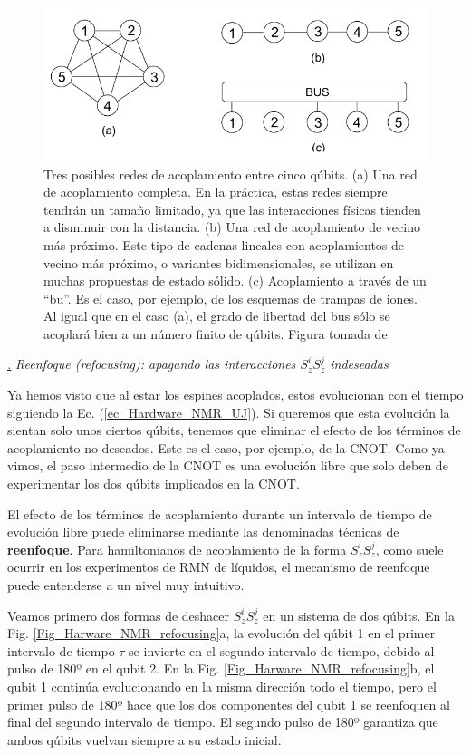 \documentclass[a4paper,11pt]{book} %
\numberwithin{equation}{chapter}
\def\subsubiContadorIt{\par\addtocounter{subsubsection}{1}\underline{\it\thesubsubsection.}\hskip0.5cm \setcounter{subsubsubsectionIt}{0}}
\newcommand{\SubsubiIt}[1]{
		\subsubiContadorIt \textit{#1}
	}
\newcounter{subsubsubsectionIt}[subsubsection]
\begin{document}
	\begin{figure}[H]
	\centering 
	\includegraphics[width=0.65\linewidth]{Figuras/Fig_Harware_NMR_posible_couplings.png}
	\caption{Tres posibles redes de acoplamiento entre cinco qúbits. (a) Una red de acoplamiento completa. En la práctica, estas redes siempre tendrán un tamaño limitado, ya que las interacciones físicas tienden a disminuir con la distancia. (b) Una red de acoplamiento de vecino más próximo. Este tipo de cadenas lineales con acoplamientos de vecino más próximo, o variantes bidimensionales, se utilizan en muchas propuestas de estado sólido. (c) Acoplamiento a través de un ``bu''. Es el caso, por ejemplo, de los esquemas de trampas de iones. Al igual que en el caso (a), el grado de libertad del bus sólo se acoplará bien a un número finito de qúbits. Figura tomada de \cite{NMR_hardware}}
	\label{Fig_Harware_NMR_posible_couplings}
	\end{figure}






			\SubsubiIt{Reenfoque (refocusing): apagando las interacciones $S_z^i S_z^j$ indeseadas} 

Ya hemos visto que al estar los espines acoplados, estos evolucionan con el tiempo siguiendo la Ec. (\ref{ec_Hardware_NMR_UJ}). Si queremos que esta evolución la sientan solo unos ciertos qúbits, tenemos que eliminar el efecto de los términos de acoplamiento no deseados. Este es el caso, por ejemplo, de la CNOT. Como ya vimos, el paso intermedio de la CNOT es una evolución libre que solo deben de experimentar los dos qúbits implicados en la CNOT. 

El efecto de los términos de acoplamiento durante un intervalo de tiempo de evolución libre puede eliminarse mediante las denominadas técnicas de \textbf{reenfoque}.  Para hamiltonianos de acoplamiento de la forma $S_z^i S_z^j$, como suele ocurrir en los experimentos de RMN de líquidos, el mecanismo de reenfoque puede entenderse a un nivel muy intuitivo. 

Veamos primero dos formas de deshacer $S_z^i S_z^j$ en un sistema de dos qúbits. En la Fig. \ref{Fig_Harware_NMR_refocusing}a, la evolución del qúbit 1 en el primer intervalo de tiempo $\tau$ se invierte en el segundo intervalo de tiempo, debido al pulso de 180º en el qubit 2. En la Fig. \ref{Fig_Harware_NMR_refocusing}b, el qubit 1 continúa evolucionando en la misma dirección todo el tiempo, pero el primer pulso de 180º hace que los dos componentes del qubit 1 se reenfoquen al final del segundo intervalo de tiempo. El segundo pulso de 180º garantiza que ambos qúbits vuelvan siempre a su estado inicial.
\end{document}
